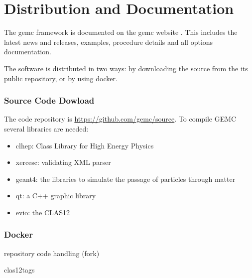 \section{Distribution and Documentation}

The gemc framework is documented on the gemc website \cite{gemc}. This includes the latest news and releases,
examples, procedure details and all options documentation.

The software is distributed in two ways: by downloading the source from the its public repository, or by using docker.

\subsubsection{Source Code Dowload}

The code repository is \url{https://github.com/gemc/source}. To compile GEMC several libraries are needed:

\begin{itemize}
	\item clhep: Class Library for High Energy Physics \cite{clhep}
	\item xercesc: validating XML parser \cite{xercesc}
	\item geant4: the libraries to simulate the passage of particles through matter \cite{geant4}
	\item qt: a C++ graphic library \cite{qt}
	\item evio: the CLAS12 
\end{itemize}


\subsubsection{Docker}




repository code handling (fork)

clas12tags




